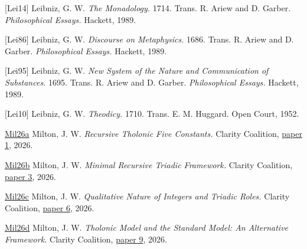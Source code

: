 \documentclass[
  11pt,
  letterpaper,
]{article}
\begin{document}
{[}Lei14{]} Leibniz, G. W. \emph{The Monadology.} 1714. Trans. R. Ariew
and D. Garber. \emph{Philosophical Essays.} Hackett, 1989.

{[}Lei86{]} Leibniz, G. W. \emph{Discourse on Metaphysics.} 1686. Trans.
R. Ariew and D. Garber. \emph{Philosophical Essays.} Hackett, 1989.

{[}Lei95{]} Leibniz, G. W. \emph{New System of the Nature and
Communication of Substances.} 1695. Trans. R. Ariew and D. Garber.
\emph{Philosophical Essays.} Hackett, 1989.

{[}Lei10{]} Leibniz, G. W. \emph{Theodicy.} 1710. Trans. E. M. Huggard.
Open Court, 1952.

\href{https://github.com/baardev/truevalue/blob/main/docnav/Research/papers/1_recursive-tholonic-five-constants/1_recursive-tholonic-five-constants.pdf}{Mil26a}
Milton, J. W. \emph{Recursive Tholonic Five Constants.} Clarity
Coalition,
\href{https://github.com/baardev/truevalue/blob/main/docnav/Research/papers/1_recursive-tholonic-five-constants/1_recursive-tholonic-five-constants.pdf}{paper
1}, 2026.

\href{https://github.com/baardev/truevalue/blob/main/docnav/Research/papers/3_minimal-recursive-triadic-framework/3_minimal-recursive-triadic-framework.pdf}{Mil26b}
Milton, J. W. \emph{Minimal Recursive Triadic Framework.} Clarity
Coalition,
\href{https://github.com/baardev/truevalue/blob/main/docnav/Research/papers/3_minimal-recursive-triadic-framework/3_minimal-recursive-triadic-framework.pdf}{paper
3}, 2026.

\href{https://github.com/baardev/truevalue/blob/main/docnav/Research/papers/6_qualitative-nature-integers-triadic-roles/6_qualitative-nature-integers-triadic-roles.pdf}{Mil26c}
Milton, J. W. \emph{Qualitative Nature of Integers and Triadic Roles.}
Clarity Coalition,
\href{https://github.com/baardev/truevalue/blob/main/docnav/Research/papers/6_qualitative-nature-integers-triadic-roles/6_qualitative-nature-integers-triadic-roles.pdf}{paper
6}, 2026.

\href{https://github.com/baardev/truevalue/blob/main/docnav/Research/papers/9_tholonic-model-standard-model-alternative/9_tholonic-model-standard-model-alternative.pdf}{Mil26d}
Milton, J. W. \emph{Tholonic Model and the Standard Model: An
Alternative Framework.} Clarity Coalition,
\href{https://github.com/baardev/truevalue/blob/main/docnav/Research/papers/9_tholonic-model-standard-model-alternative/9_tholonic-model-standard-model-alternative.pdf}{paper
9}, 2026.
\end{document}
